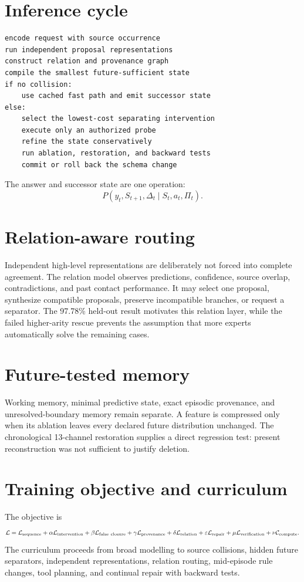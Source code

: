 \documentclass[11pt,a4paper]{article}
\begin{document}
\section{Inference cycle}
\begin{verbatim}
encode request with source occurrence
run independent proposal representations
construct relation and provenance graph
compile the smallest future-sufficient state
if no collision:
    use cached fast path and emit successor state
else:
    select the lowest-cost separating intervention
    execute only an authorized probe
    refine the state conservatively
    run ablation, restoration, and backward tests
    commit or roll back the schema change
\end{verbatim}
The answer and successor state are one operation:
\begin{equation}
P(y_t,S_{t+1},\Delta_t\mid S_t,a_t,\Pi_t).
\end{equation}

\section{Relation-aware routing}
Independent high-level representations are deliberately not forced into complete agreement. The relation model observes predictions, confidence, source overlap, contradictions, and past contact performance. It may select one proposal, synthesize compatible proposals, preserve incompatible branches, or request a separator. The 97.78\% held-out result motivates this relation layer, while the failed higher-arity rescue prevents the assumption that more experts automatically solve the remaining cases.

\section{Future-tested memory}
Working memory, minimal predictive state, exact episodic provenance, and unresolved-boundary memory remain separate. A feature is compressed only when its ablation leaves every declared future distribution unchanged. The chronological 13-channel restoration supplies a direct regression test: present reconstruction was not sufficient to justify deletion.

\section{Training objective and curriculum}
The objective is
\begin{equation}
\mathcal L=\mathcal L_{\rm sequence}
+\alpha\mathcal L_{\rm intervention}
+\beta\mathcal L_{\rm false\ closure}
+\gamma\mathcal L_{\rm provenance}
+\delta\mathcal L_{\rm relation}
+\varepsilon\mathcal L_{\rm repair}
+\mu\mathcal L_{\rm verification}
+\nu\mathcal C_{\rm compute}.
\end{equation}
The curriculum proceeds from broad modelling to source collisions, hidden future separators, independent representations, relation routing, mid-episode rule changes, tool planning, and continual repair with backward tests.
\end{document}
